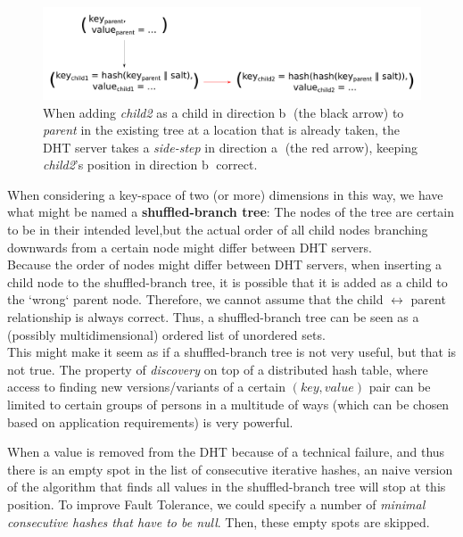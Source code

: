 \documentclass[a4paper]{article}
\begin{document}
\begin{figure}
	
	\includegraphics[width=\textwidth]{sidestep_explanation.pdf}
	\caption{
	\label{fig:sidestep}	
	When adding \textit{child2} as a child in direction \textcircled{b} (the black arrow) to \textit{parent} in the existing tree at a location that is already taken, the DHT server takes a \textit{side-step} in direction \textcircled{a} (the red arrow), keeping \textit{child2}'s position in direction \textcircled{b} correct. }
\end{figure}

When considering a key-space of two (or more) dimensions in this way, we have what might be named a \textbf{shuffled-branch tree}: The nodes of the tree are certain to be in their intended level,but the actual order of all child nodes branching downwards from a certain node might differ between DHT servers.\\

Because the order of nodes might differ between DHT servers, when inserting a child node to the shuffled-branch tree, it is possible that it is added as a child to the `wrong` parent node. Therefore, we cannot assume that the child $\leftrightarrow$ parent relationship is always correct. Thus, a shuffled-branch tree can be seen as a (possibly multidimensional) ordered list of unordered sets.\\

This might make it seem as if a shuffled-branch tree is not very useful, but that is not true. The property of \textit{discovery} on top of a distributed hash table, where access to finding new versions/variants of a certain $(key,value)$ pair can be limited to certain groups of persons in a multitude of ways (which can be chosen based on application requirements) is very powerful. 



When a value is removed from the DHT because of a technical failure, and thus there is an empty spot in the list of consecutive iterative hashes, an naive version of the algorithm that finds all values in the shuffled-branch tree will stop at this position. To improve Fault Tolerance, we could specify a number of \textit{minimal consecutive hashes that have to be null}. Then, these empty spots are skipped.
\end{document}
